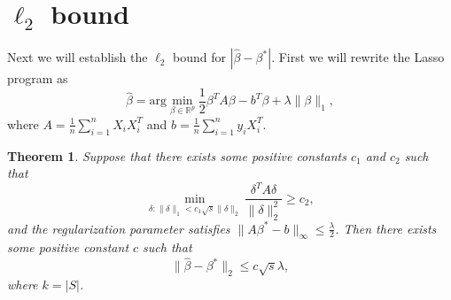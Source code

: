 \documentclass[12pt]{article}
\numberwithin{equation}{section}
\newtheorem{theorem}{Theorem}[section]
\begin{document}
\section{$\ell_2$ bound}
Next we will establish the $\ell_2$ bound for $\left|\hat{\beta}-\beta^{*}\right|$. First we will rewrite the Lasso program as
\begin{equation}
\hat\beta=\text{arg}\min_{\beta \in \mathbb{R}^p}\frac{1}{2}\beta^TA\beta-b^T\beta+\lambda\|\beta\|_1,
\end{equation}
where $A=\frac{1}{n}\sum_{i=1}^{n}X_iX_i^T$ and $b=\frac{1}{n}\sum_{i=1}^{n}y_iX_i^T$.
\begin{theorem}
	Suppose that there exists some positive constants $c_1$ and $c_2$ such that 
	\begin{equation}
	\min_{\delta:\|\delta\|_1<c_1\sqrt{s}\|\delta\|_2}\frac{\delta^TA\delta}{\|\delta\|_2^2}\geq c_2,
	\end{equation}\label{7.16}
	and the regularization parameter satisfies $\|A\beta^{*}-b\|_{\infty}\leq \frac{\lambda}{2}$. Then there exists some positive constant $c$ such that
	\begin{equation}
	\|\hat{\beta}-\beta^{*}\|_2\leq c\sqrt{s}\lambda,
	\end{equation}
	where $k=|S|$.
\end{theorem}
\end{document}
